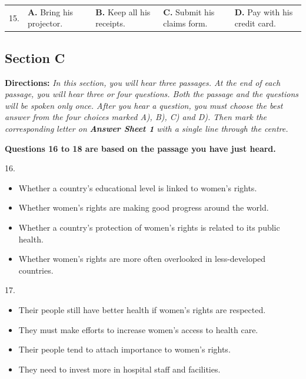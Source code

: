 \documentclass[UTF8,11pt]{ctexart}
\begin{document}
\noindent\begin{tabularx}{\linewidth}{@{}lXXXX@{}}15. & \textbf{A.} Bring his projector. & \textbf{B.} Keep all his receipts. & \textbf{C.} Submit his claims form. & \textbf{D.} Pay with his credit card.\\\end{tabularx}\par

\subsection*{\textbf{Section C}}


\textbf{Directions:}\textit{ In this section, you will hear three passages. At the end of each passage, you will hear three or} \textit{four questions. Both the passage and the questions will be spoken only once. After you hear a question, you} \textit{must choose the best answer from the four choices marked A), B), C) and D). Then mark the corresponding} \textit{letter on }\textbf{\textit{Answer Sheet 1}}\textit{ with a single line through the centre.}


\textbf{Questions 16 to 18 are based on the passage you have just heard.}


16.


\begin{itemize}[leftmargin=2em,itemsep=.2em,topsep=.4em]\item[A.] Whether a country's educational level is linked to women's rights.
\item[B.] Whether women's rights are making good progress around the world.
\item[C.] Whether a country's protection of women's rights is related to its public health.
\item[D.] Whether women's rights are more often overlooked in less-developed countries.
\end{itemize}

17.


\begin{itemize}[leftmargin=2em,itemsep=.2em,topsep=.4em]\item[A.] Their people still have better health if women's rights are respected.
\item[B.] They must make efforts to increase women's access to health care.
\item[C.] Their people tend to attach importance to women's rights.
\item[D.] They need to invest more in hospital staff and facilities.
\end{itemize}
\end{document}
